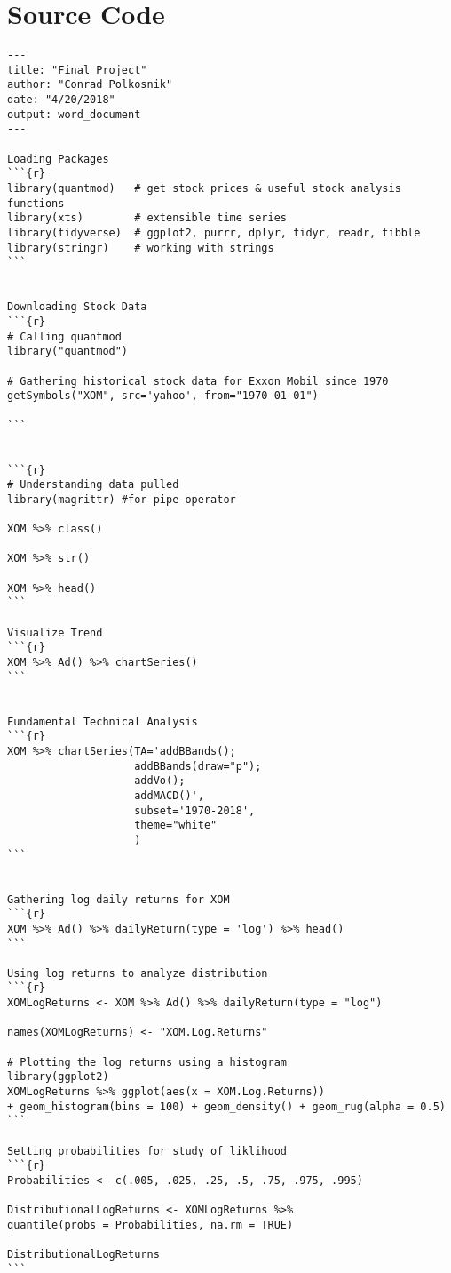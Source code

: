 \documentclass{article}
\begin{document}
\section{Source Code}
\begin{verbatim}
---
title: "Final Project"
author: "Conrad Polkosnik"
date: "4/20/2018"
output: word_document
---

Loading Packages
```{r}
library(quantmod)   # get stock prices & useful stock analysis functions
library(xts)        # extensible time series
library(tidyverse)  # ggplot2, purrr, dplyr, tidyr, readr, tibble
library(stringr)    # working with strings
```


Downloading Stock Data
```{r}
# Calling quantmod
library("quantmod")

# Gathering historical stock data for Exxon Mobil since 1970
getSymbols("XOM", src='yahoo', from="1970-01-01")

```


```{r}
# Understanding data pulled
library(magrittr) #for pipe operator

XOM %>% class()

XOM %>% str()

XOM %>% head()
```

Visualize Trend
```{r}
XOM %>% Ad() %>% chartSeries()
```


Fundamental Technical Analysis
```{r}
XOM %>% chartSeries(TA='addBBands();
                    addBBands(draw="p");
                    addVo();
                    addMACD()',
                    subset='1970-2018',
                    theme="white"
                    )
```


Gathering log daily returns for XOM
```{r}
XOM %>% Ad() %>% dailyReturn(type = 'log') %>% head()
```

Using log returns to analyze distribution
```{r}
XOMLogReturns <- XOM %>% Ad() %>% dailyReturn(type = "log")

names(XOMLogReturns) <- "XOM.Log.Returns"

# Plotting the log returns using a histogram
library(ggplot2)
XOMLogReturns %>% ggplot(aes(x = XOM.Log.Returns))
+ geom_histogram(bins = 100) + geom_density() + geom_rug(alpha = 0.5)
```

Setting probabilities for study of liklihood
```{r}
Probabilities <- c(.005, .025, .25, .5, .75, .975, .995)

DistributionalLogReturns <- XOMLogReturns %>%
quantile(probs = Probabilities, na.rm = TRUE)

DistributionalLogReturns
```



\end{verbatim}
\end{document}
